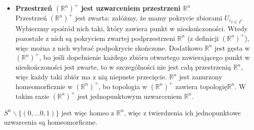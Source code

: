 \begin{itemize}
\item \textbf{Przestrzeń $(\mathbb{R}^n)^{+}$ jest uzwarceniem przestrzeni $\mathbb{R}^n$}\\
Przestrzeń $(\mathbb{R}^n)^{+}$ jest zwarta: załóżmy, że mamy pokrycie zbiorami ${U_i}_{i \in I}$. Wybierzmy spośród nich taki, który zawiera punkt w nieskończoności. Wtedy pozostałe z nich są pokryciem zwartej podprzestrzeni $\mathbb{R}^n$ (z definicji $(\mathbb{R}^n)^{+}$), więc można z nich wybrać podpokrycie skończone.
Dodatkowo $\mathbb{R}^n$ jest gęsta w $(\mathbb{R}^n)^{+}$, bo jeśli dopełnienie każdego zbióru otwartego zawierającego punkt w nieskończoności jest zwarte, to w szczególności nie jest całą przestrzenią $\mathbb{R}^n$, więc każdy taki zbiór ma z nią niepuste przecięcie.
$\mathbb{R}^n$ jest zanurzony homeomorficznie w $(\mathbb{R}^n)^{+}$, bo topologia w $(\mathbb{R}^n)^{+}$ zawiera topologię$\mathbb{R}^n$.
W takim razie $(\mathbb{R}^n)^{+}$ jest jednopunktowym uzwarceniem $\mathbb{R}^n$.
\end{itemize}

$ S^n \backslash \{(0, ... 0, 1)\}$ jest więc homeo z $\mathbb{R}^n$, więc z twierdzenia ich jednopunktowe uzwarcenia są homeomorficzne.

